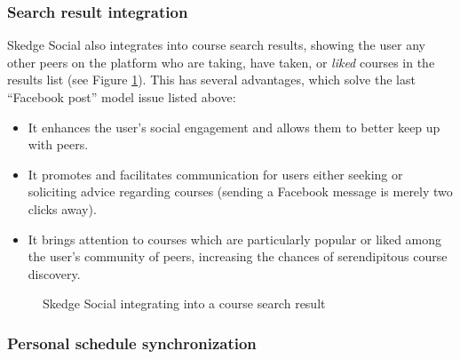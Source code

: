   \subsubsection{Search result integration}

  Skedge Social also integrates into course search results, showing the user any other peers on the platform who are taking, have taken, or \emph{liked} courses in the results list (see Figure \ref{fig:sk-social-course}). This has several advantages, which solve the last ``Facebook post'' model issue listed above:

  \begin{itemize}

  \item It enhances the user's social engagement and allows them to better keep up with peers.
  \item It promotes and facilitates communication for users either seeking or soliciting advice regarding courses (sending a Facebook message is merely two clicks away).
  \item It brings attention to courses which are particularly popular or liked among the user's community of peers, increasing the chances of serendipitous course discovery.

  \end{itemize}

    \begin{figure}
      \centering
      \caption{Skedge Social integrating into a course search result} \label{fig:sk-social-course}
    \end{figure}

  \subsubsection{Personal schedule synchronization}

